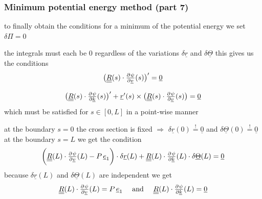 \begin{frame}
  \frametitle{Minimum potential energy method (part 7)}
  
  to finally obtain the conditions for a minimum of the potential energy we set $\delta \Pi = 0$
  
  \vspace{0.5em}
  the integrals must each be $0$ regardless of the variations $\delta \underline{r}$ and $\delta \underline{\Theta}$ \newline
  this gives us the conditions
  \begin{displaymath}
    \bigl( \doubleunderline{R}(s) \cdot \pd{\psi}{\underline{v}}(s) \bigr)^{\prime} = \underline{0}
  \end{displaymath}
  
  \begin{displaymath}
    \bigl( \doubleunderline{R}(s) \cdot \pd{\psi}{\underline{k}}(s) \bigr)^{\prime} +
        \underline{r}^{\prime}(s) \times \bigl( \doubleunderline{R}(s) \cdot \pd{\psi}{\underline{v}}(s)  \bigr) = \underline{0}
  \end{displaymath}
  which must be satisfied for $s \in [0,L]$ in a point-wise manner
  
  \vspace{0.5em}
  at the boundary $s=0$ the cross section is fixed $\Rightarrow$ $\delta \underline{r}(0) \overset{!}{=} \underline{0}$ and $\delta \underline{\Theta}(0) \overset{!}{=} \underline{0}$ \newline
  at the boundary $s=L$ we get the condition
  \begin{displaymath}
    \biggl(
      \doubleunderline{R}(L) \cdot \pd{\psi}{\underline{v}}(L) 
      -P \, \underline{e}_1
    \biggr) \cdot \delta \underline{r}(L) +
    \doubleunderline{R}(L) \cdot \pd{\psi}{\underline{k}}(L) \cdot \delta \underline{\Theta}(L) =
    \underline{0}
  \end{displaymath}
  because $\delta \underline{r}(L)$ and $\delta \underline{\Theta}(L)$ are independent we get
  \begin{displaymath}
    \doubleunderline{R}(L) \cdot \pd{\psi}{\underline{v}}(L) 
      = P \, \underline{e}_1
    \quad \text{ and } \quad
    \doubleunderline{R}(L) \cdot \pd{\psi}{\underline{k}}(L) = \underline{0}
  \end{displaymath}
\end{frame}


